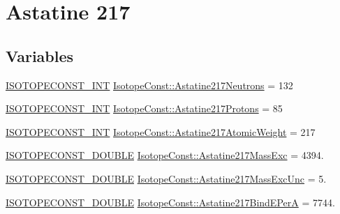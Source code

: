 \hypertarget{group___isotope_const-_astatine-_at217}{}\section{Astatine 217}
\label{group___isotope_const-_astatine-_at217}
\subsection*{Variables}
\begin{DoxyCompactItemize}
\item 
\mbox{\hyperlink{group___isotope_const-_macros_ga5f18360b3e99483a35c32d789e62621c}{I\+S\+O\+T\+O\+P\+E\+C\+O\+N\+S\+T\+\_\+\+I\+NT}} \mbox{\hyperlink{group___isotope_const-_astatine-_at217_ga969211554914b990672f5376d531165f}{Isotope\+Const\+::\+Astatine217\+Neutrons}} = 132
\item 
\mbox{\hyperlink{group___isotope_const-_macros_ga5f18360b3e99483a35c32d789e62621c}{I\+S\+O\+T\+O\+P\+E\+C\+O\+N\+S\+T\+\_\+\+I\+NT}} \mbox{\hyperlink{group___isotope_const-_astatine-_at217_gaf42a79eec645ea3821e465e8d22046e3}{Isotope\+Const\+::\+Astatine217\+Protons}} = 85
\item 
\mbox{\hyperlink{group___isotope_const-_macros_ga5f18360b3e99483a35c32d789e62621c}{I\+S\+O\+T\+O\+P\+E\+C\+O\+N\+S\+T\+\_\+\+I\+NT}} \mbox{\hyperlink{group___isotope_const-_astatine-_at217_gacc31bb8348d066fb227eea5fc9e509d9}{Isotope\+Const\+::\+Astatine217\+Atomic\+Weight}} = 217
\item 
\mbox{\hyperlink{group___isotope_const-_macros_ga8f45a7272ce02c0b4c65c44636ed719a}{I\+S\+O\+T\+O\+P\+E\+C\+O\+N\+S\+T\+\_\+\+D\+O\+U\+B\+LE}} \mbox{\hyperlink{group___isotope_const-_astatine-_at217_ga590eb5500497f9ae1e62e1339cd3ef6a}{Isotope\+Const\+::\+Astatine217\+Mass\+Exc}} = 4394.
\item 
\mbox{\hyperlink{group___isotope_const-_macros_ga8f45a7272ce02c0b4c65c44636ed719a}{I\+S\+O\+T\+O\+P\+E\+C\+O\+N\+S\+T\+\_\+\+D\+O\+U\+B\+LE}} \mbox{\hyperlink{group___isotope_const-_astatine-_at217_ga62dcec6a7fb058a52790441aaeab95f3}{Isotope\+Const\+::\+Astatine217\+Mass\+Exc\+Unc}} = 5.
\item 
\mbox{\hyperlink{group___isotope_const-_macros_ga8f45a7272ce02c0b4c65c44636ed719a}{I\+S\+O\+T\+O\+P\+E\+C\+O\+N\+S\+T\+\_\+\+D\+O\+U\+B\+LE}} \mbox{\hyperlink{group___isotope_const-_astatine-_at217_ga2f2519c9d7d2d22164676901392f89f2}{Isotope\+Const\+::\+Astatine217\+Bind\+E\+PerA}} = 7744.
\item 

\end{DoxyCompactItemize}
